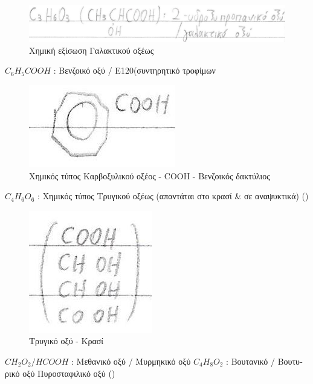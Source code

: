 \documentclass[12pt]{article}
\begin{document}
\begin{flushleft}
	\begin{figure}[H]
	\centering
	\includegraphics[scale=1]{lacticAcid}
	\caption{\textgreek{Χημική εξίσωση Γαλακτικού οξέως}}
	\label{fig:lacticAcid}
	\end{figure}
	
	\textbullet \quad $\displaystyle C_6H_5COOH $  :  \textgreek{Βενζοικό οξύ} / E120(\textgreek{συντηρητικό τροφίμων} \linebreak 
	
	\begin{figure}[H]
	\centering
	\includegraphics[scale=1.4]{cooh}
	\caption{\textgreek{Χημικός τύπος Καρβοξυλικού οξέος - } COOH - \textgreek{Βενζοικός δακτύλιος}}
	\label{fig:cooh}
	\end{figure}
	
	\textbullet \quad $\displaystyle C_4H_6O_6$  :  \textgreek{Χημικός τύπος Τρυγικού οξέως (απαντάται στο κρασί \& σε αναψυκτικά)} () \linebreak 
	
	\begin{figure}[H]
	\centering
	\includegraphics[scale=1.4]{tartaricAcid}
	\caption{\textgreek{Τρυγικό οξύ - Κρασί}}
	\label{fig:tartaricAcid}
	\end{figure}
	
	\textbullet \quad $\displaystyle CH_2O_2 / HCOOH $  :  \textgreek{Μεθανικό οξύ / Μυρμηκικό οξύ} \linebreak 
	\textbullet \quad $\displaystyle C_4H_8O_2 $  :  \textgreek{Βουτανικό / Βουτυρικό οξύ} \linebreak 
	\textbullet \quad \textgreek{Πυροσταφιλικό οξύ} () \linebreak 
	

\end{flushleft}
\end{document}
